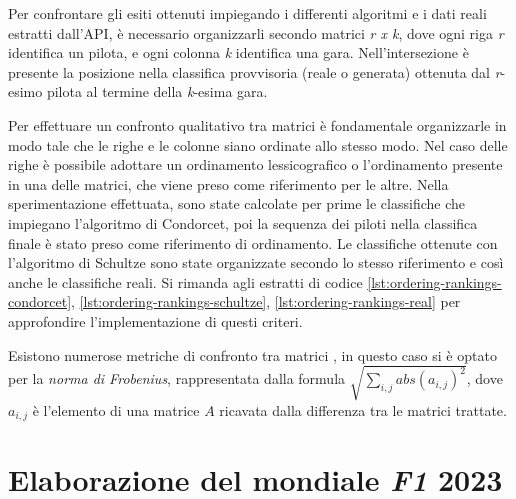 \documentclass[12pt,a4paper,openright,twoside]{book}
\begin{document}


Per confrontare gli esiti ottenuti impiegando i differenti algoritmi e i dati reali estratti dall'API,
è necessario organizzarli secondo matrici \textit{r x k}, dove ogni riga \textit{r} identifica un pilota,
e ogni colonna \textit{k} identifica una gara. Nell'intersezione è presente la
posizione nella classifica provvisoria (reale o generata) ottenuta dal \textit{r}-esimo pilota al termine della
\textit{k}-esima gara.

Per effettuare un confronto qualitativo tra matrici è fondamentale organizzarle in modo tale che le righe e le colonne
siano ordinate allo stesso modo. Nel caso delle righe è possibile adottare un ordinamento lessicografico o 
l'ordinamento presente in una delle matrici, che viene preso come riferimento per le altre.
Nella sperimentazione effettuata, sono state calcolate per prime le classifiche che impiegano l'algoritmo di Condorcet,
poi la sequenza dei piloti nella classifica finale è stato preso come riferimento di ordinamento.
Le classifiche ottenute con l'algoritmo di Schultze sono state organizzate secondo lo stesso riferimento e così anche
le classifiche reali. Si rimanda agli estratti di codice \ref{lst:ordering-rankings-condorcet}, \ref{lst:ordering-rankings-schultze},
\ref{lst:ordering-rankings-real} per approfondire l'implementazione di questi criteri.

Esistono numerose metriche di confronto tra matrici \cite{golub2013matrix}, in questo caso si è optato per la \textit{norma di Frobenius},
rappresentata dalla formula $\sqrt{\sum_{i,j}^{} abs(a_{i,j})^2}$, dove $a_{i,j}$ è l'elemento di una matrice $A$ ricavata dalla
differenza tra le matrici trattate.





\section{Elaborazione del mondiale \textit{F1} 2023}
\end{document}
